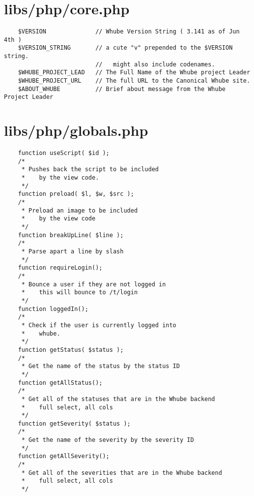 \section{libs/php/core.php}
\begin{verbatim}
    $VERSION              // Whube Version String ( 3.141 as of Jun 4th )
    $VERSION_STRING       // a cute "v" prepended to the $VERSION string.
                          //   might also include codenames.
    $WHUBE_PROJECT_LEAD   // The Full Name of the Whube project Leader
    $WHUBE_PROJECT_URL    // The full URL to the Canonical Whube site.
    $ABOUT_WHUBE          // Brief about message from the Whube Project Leader
\end{verbatim}
\section{libs/php/globals.php}
\begin{verbatim}
    function useScript( $id );
    /*
     * Pushes back the script to be included
     *    by the view code.
     */
    function preload( $l, $w, $src );
    /*
     * Preload an image to be included
     *    by the view code
     */
    function breakUpLine( $line );
    /*
     * Parse apart a line by slash
     */
    function requireLogin();
    /*
     * Bounce a user if they are not logged in
     *    this will bounce to /t/login
     */
    function loggedIn();
    /*
     * Check if the user is currently logged into
     *    whube.
     */
    function getStatus( $status );
    /*
     * Get the name of the status by the status ID
     */
    function getAllStatus();
    /*
     * Get all of the statuses that are in the Whube backend
     *    full select, all cols
     */
    function getSeverity( $status );
    /*
     * Get the name of the severity by the severity ID
     */
    function getAllSeverity();
    /*
     * Get all of the severities that are in the Whube backend
     *    full select, all cols
     */
\end{verbatim}

